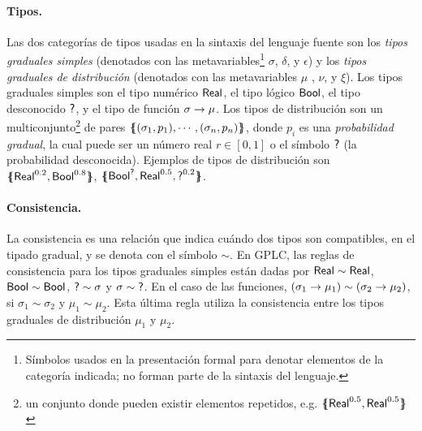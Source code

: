 \paragraph{Tipos.}\label{par:gplc-types} Las dos categorías de tipos
usadas en la sintaxis del lenguaje fuente son los \emph{tipos
  graduales simples} (denotados con las
metavariables\footnote{Símbolos usados en la presentación formal para
  denotar elementos de la categoría indicada; no forman parte de la
  sintaxis del lenguaje.} $\sigma$, $\delta$, y $\epsilon$) y los
\emph{tipos graduales de distribución} (denotados con las
metavariables $\mu$ , $\nu$, y $\xi$). Los tipos graduales simples son
el tipo numérico $\mathord{\text{\sffamily Real}}$, el tipo lógico $\mathord{\text{\sffamily Bool}}$, el tipo desconocido
$\mathord{\text{\sffamily ?}}$, y el tipo de función $\sigma \to \mu$. Los tipos de
distribución son un multiconjunto\footnote{un conjunto donde pueden
  existir elementos repetidos, e.g. $\{\mskip-7mu\{ {\mathord{\text{\sffamily Real}}^{0.5},\mathord{\text{\sffamily Real}}^{0.5}} \}\mskip-7mu\}$}
de pares
$\{\mskip-7mu\{ {(\sigma_1,p_1),\cdots,(\sigma_n,p_n)} \}\mskip-7mu\}$, donde $p_i$ es una
\emph{probabilidad gradual}, la cual puede ser un número real
$r\in[0,1]$ o el símbolo $\mathord{\text{\sffamily ?}}$ (la probabilidad
desconocida). Ejemplos de tipos de distribución son
$\{\mskip-7mu\{ {\mathord{\text{\sffamily Real}}^{0.2},\mathord{\text{\sffamily Bool}}^{0.8}} \}\mskip-7mu\}$,
$\{\mskip-7mu\{ {\mathord{\text{\sffamily Bool}}^{\mathord{\text{\sffamily ?}}}, \mathord{\text{\sffamily Real}}^{0.5}, \mathord{\text{\sffamily ?}}^{0.2}} \}\mskip-7mu\}$.




\paragraph{Consistencia.}\label{par:consistency} La consistencia es una relación que indica cuándo dos tipos son compatibles, en el tipado gradual, y se denota con el símbolo $\sim$.  En GPLC, las reglas de consistencia para los tipos graduales simples están dadas por $\mathord{\text{\sffamily Real}}\sim\mathord{\text{\sffamily Real}}$, $\mathord{\text{\sffamily Bool}}\sim\mathord{\text{\sffamily Bool}}$, $\mathord{\text{\sffamily ?}}\sim \sigma$ y $\sigma \sim\mathord{\text{\sffamily ?}}$. En el caso de las funciones, $(\sigma_1 \to \mu_1) \sim (\sigma_2 \to \mu_2)$, si $\sigma_1\sim\sigma_2$ y $\mu_1\sim\mu_2$. Esta última regla utiliza la consistencia entre los tipos graduales de distribución $\mu_1$ y  $\mu_2$.

